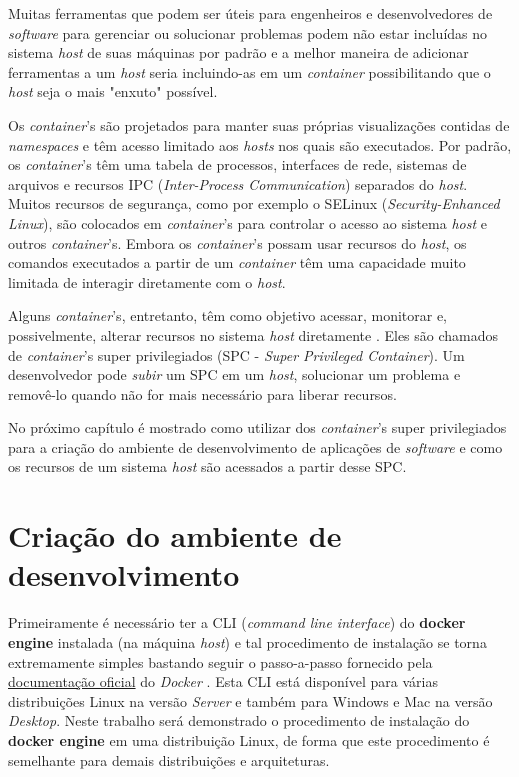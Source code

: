 \documentclass[
  12pt,				%
  openright,			%
  twoside,			%
  a4paper,			%
  english,			%
  french,				%
  spanish,			%
  brazil,				%
  ]{abntex2}
\begin{document}
Muitas ferramentas que podem ser úteis para engenheiros e desenvolvedores de \textit{software} para gerenciar ou solucionar problemas podem não estar
incluídas no sistema \textit{host} de suas máquinas por padrão e a melhor maneira de adicionar ferramentas a um \textit{host} seria
incluindo-as em um \textit{container} possibilitando que o \textit{host} seja o mais "enxuto" possível.

Os \textit{container}'s são projetados para manter suas próprias visualizações contidas de \textit{namespaces} e têm acesso limitado aos \textit{hosts} nos quais
são executados. Por padrão, os \textit{container}'s têm uma tabela de processos, interfaces de rede, sistemas de arquivos e recursos IPC
(\textit{Inter-Process Communication}) separados do \textit{host}.
Muitos recursos de segurança, como por exemplo o SELinux (\textit{Security-Enhanced Linux}), são colocados em \textit{container}'s para controlar o acesso ao sistema \textit{host} e outros
\textit{container}'s. Embora os \textit{container}'s possam usar recursos do \textit{host}, os comandos executados a partir de um \textit{container} têm uma capacidade muito
limitada de interagir diretamente com o \textit{host}.

Alguns \textit{container}'s, entretanto, têm como objetivo acessar, monitorar e, possivelmente, alterar recursos no sistema \textit{host}
diretamente \cite{RHEL-container:2020}. Eles são chamados de \textit{container}'s super privilegiados (SPC - \textit{Super Privileged Container}). Um desenvolvedor
pode \textit{subir} um SPC em um \textit{host}, solucionar um problema e removê-lo quando não for mais necessário para liberar recursos.

No próximo capítulo é mostrado como utilizar dos \textit{container}'s super privilegiados para a criação do ambiente de
desenvolvimento de aplicações de \textit{software} e como os recursos de um sistema \textit{host} são acessados a partir desse SPC.

\section*{Criação do ambiente de desenvolvimento}

Primeiramente é necessário ter a CLI (\textit{command line interface}) do \textbf{docker engine} instalada (na máquina \textit{host}) e tal procedimento de
instalação se torna extremamente simples bastando seguir o passo-a-passo fornecido pela \href{https://docs.docker.com/engine/install/}{documentação oficial}
do \textit{Docker} \cite{Docker:2020}.
Esta CLI está disponível para várias distribuições Linux na versão \textit{Server} e também para Windows e Mac na versão \textit{Desktop}. Neste trabalho será
demonstrado o procedimento de instalação do \textbf{docker engine} em uma distribuição Linux, de forma que este procedimento é semelhante para demais distribuições
e arquiteturas.
\end{document}
